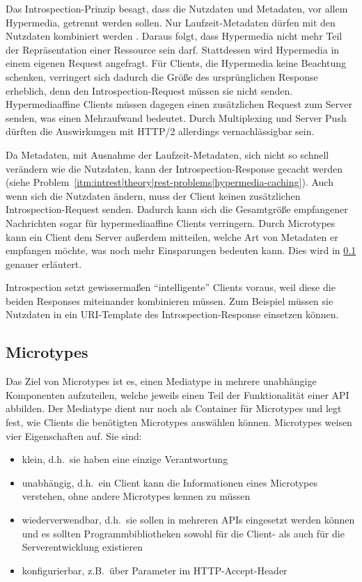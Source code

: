Das Introspection-Prinzip besagt, dass die Nutzdaten und Metadaten, vor allem Hypermedia, getrennt werden sollen. Nur Laufzeit-Metadaten dürfen mit den Nutzdaten kombiniert werden \autocite[Abs.~9.3.2]{Vasilakis2017}. Daraus folgt, dass Hypermedia nicht mehr Teil der Repräsentation einer Ressource sein darf. Stattdessen wird Hypermedia in einem eigenen Request angefragt. Für Clients, die Hypermedia keine Beachtung schenken, verringert sich dadurch die Größe des ursprünglichen Response erheblich, denn den Introspection-Request müssen sie nicht senden. Hypermediaaffine Clients müssen dagegen einen zusätzlichen Request zum Server senden, was einen Mehraufwand bedeutet. Durch Multiplexing und Server Push dürften die Auswirkungen mit HTTP/2 allerdings vernachlässigbar sein.

Da Metadaten, mit Ausnahme der Laufzeit-Metadaten, sich nicht so schnell verändern wie die Nutzdaten, kann der Introspection-Response gecacht werden (siehe Problem~\ref{itm:intrest|theory|rest-problems|hypermedia-caching}). Auch wenn sich die Nutzdaten ändern, muss der Client keinen zusätzlichen Introspection-Request senden. Dadurch kann sich die Gesamtgröße empfangener Nachrichten sogar für hypermediaaffine Clients verringern. Durch Microtypes kann ein Client dem Server außerdem mitteilen, welche Art von Metadaten er empfangen möchte, was noch mehr Einsparungen bedeuten kann. Dies wird in \cref{subsec:intrest|theory|microtypes} genauer erläutert.

Introspection setzt gewissermaßen \enquote{intelligente} Clients voraus, weil diese die beiden Responses miteinander kombinieren müssen. Zum Beispiel müssen sie Nutzdaten in ein URI-Template des Introspection-Response einsetzen können.

\FloatBarrier{}
\subsection{Microtypes}\label{subsec:intrest|theory|microtypes}
Das Ziel von Microtypes ist es, einen Mediatype in mehrere unabhängige Komponenten aufzuteilen, welche jeweils einen Teil der Funktionalität einer API abbilden. Der Mediatype dient nur noch als Container für Microtypes und legt fest, wie Clients die benötigten Microtypes auswählen können. Microtypes weisen vier Eigenschaften auf. Sie sind:

\begin{itemize}[noitemsep,topsep=0pt]
    \item klein, d.h.\ sie haben eine einzige Verantwortung
    \item unabhängig, d.h.\ ein Client kann die Informationen eines Microtypes verstehen, ohne andere Microtypes kennen zu müssen
    \item wiederverwendbar, d.h.\ sie sollen in mehreren APIs eingesetzt werden können und es sollten Programmbibliotheken sowohl für die Client- als auch für die Serverentwicklung existieren
    \item konfigurierbar, z.B.\ über Parameter im HTTP-Accept-Header \autocite{Vasilakis2017a}
\end{itemize}


